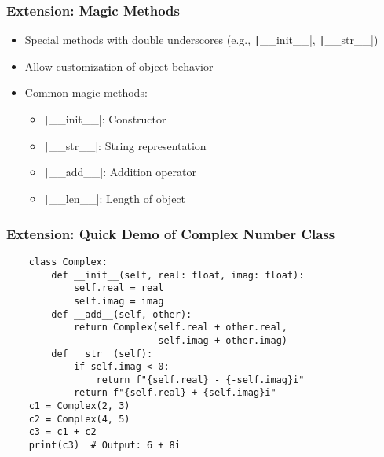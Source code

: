 \documentclass{beamer}
\newcommand{\python}[1]{\texttt|#1|}
\begin{document}
\begin{frame}
    \frametitle{Extension: Magic Methods}
    \begin{itemize}
        \item Special methods with double underscores (e.g., \python{__init__}, \python{__str__})
        \item Allow customization of object behavior
        \item Common magic methods:
              \begin{itemize}
                  \item \python{__init__}: Constructor
                  \item \python{__str__}: String representation
                  \item \python{__add__}: Addition operator
                  \item \python{__len__}: Length of object
              \end{itemize}
    \end{itemize}
\end{frame}

\begin{frame}[fragile]
    \frametitle{Extension: Quick Demo of Complex Number Class}
    \begin{verbatim}
    class Complex:
        def __init__(self, real: float, imag: float):
            self.real = real
            self.imag = imag
        def __add__(self, other):
            return Complex(self.real + other.real,
                           self.imag + other.imag)
        def __str__(self):
            if self.imag < 0:
                return f"{self.real} - {-self.imag}i"
            return f"{self.real} + {self.imag}i"
    c1 = Complex(2, 3)
    c2 = Complex(4, 5)
    c3 = c1 + c2
    print(c3)  # Output: 6 + 8i
    \end{verbatim}
\end{frame}
\end{document}
